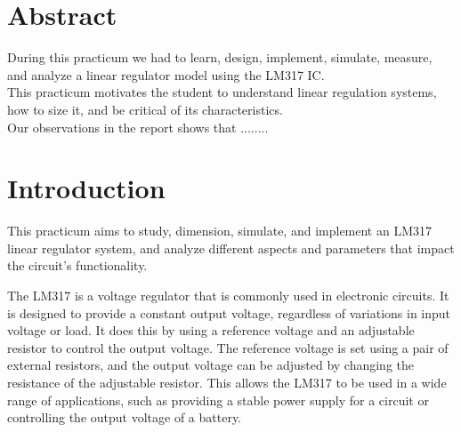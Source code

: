 \documentclass[12pt]{article}
\begin{document}
\pagestyle{fancy}
\chead {\today}
\fontsize{16}{16}\selectfont


\clearpage

\section*{Abstract}
{
During this practicum we had to learn, design, implement, simulate, measure, and analyze a linear regulator model using the LM317 IC.\\ 
This practicum motivates the student to understand linear regulation systems, how to size it, and be critical of its characteristics.\\
Our observations in the report shows that  ........
}
\clearpage

\tableofcontents
\clearpage

\section{Introduction}
This practicum aims to study, dimension, simulate, and implement an LM317 linear regulator system, and analyze different aspects and parameters that impact the circuit's functionality. \vspace{+12pt}

The LM317 is a voltage regulator that is commonly used in electronic circuits. It is designed to provide a constant output voltage, regardless of variations in input voltage or load. It does this by using a reference voltage and an adjustable resistor to control the output voltage. The reference voltage is set using a pair of external resistors, and the output voltage can be adjusted by changing the resistance of the adjustable resistor. This allows the LM317 to be used in a wide range of applications, such as providing a stable power supply for a circuit or controlling the output voltage of a battery.
\clearpage





\end{document}
